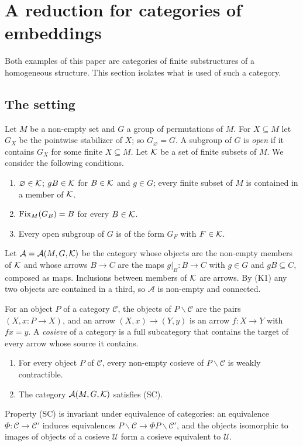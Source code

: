 \section{A reduction for categories of embeddings}\label{sec:reduction}

Both examples of this paper are categories of finite substructures of a
homogeneous structure. This section isolates what is used of such a category.

\subsection{The setting}

Let $M$ be a non-empty set and $G$ a group of permutations of $M$. For
$X\subseteq M$ let $G_X$ be the pointwise stabilizer of $X$; so
$G_\varnothing=G$. A subgroup of $G$ is \emph{open} if it contains $G_X$ for
some finite $X\subseteq M$. Let $\mathcal{K}$ be a set of finite subsets of $M$. We
consider the following conditions.
\begin{enumerate}
\item[\textup{(K1)}] $\varnothing\in\mathcal{K}$; $gB\in\mathcal{K}$ for $B\in\mathcal{K}$ and $g\in G$; every
 finite subset of $M$ is contained in a member of $\mathcal{K}$.
\item[\textup{(K2)}] $\operatorname{Fix}_M(G_B)=B$ for every $B\in\mathcal{K}$.
\item[\textup{(K3)}] Every open subgroup of $G$ is of the form $G_F$ with $F\in\mathcal{K}$.
\end{enumerate}
Let $\mathcal A=\mathcal A(M,G,\mathcal{K})$ be the category whose objects are the
non-empty members of $\mathcal{K}$ and whose arrows $B\to C$ are the maps
$g|_B\colon B\to C$ with $g\in G$ and $gB\subseteq C$, composed as maps.
Inclusions between members of $\mathcal{K}$ are arrows. By (K1) any two objects are
contained in a third, so $\mathcal A$ is non-empty and connected.

For an object $P$ of a category $\mathcal C$, the objects of
$P\backslash\mathcal C$ are the pairs $(X,x\colon P\to X)$, and an arrow
$(X,x)\to(Y,y)$ is an arrow $f\colon X\to Y$ with $fx=y$. A \emph{cosieve} of a
category is a full subcategory that contains the target of every arrow whose
source it contains.
\begin{enumerate}
\item[\textup{(SC)}] For every object $P$ of $\mathcal C$, every non-empty cosieve
 of $P\backslash\mathcal C$ is weakly contractible.
\item[\textup{(K4)}] The category $\mathcal A(M,G,\mathcal{K})$ satisfies \textup{(SC)}.
\end{enumerate}
Property (SC) is invariant under equivalence of categories: an equivalence
$\Phi\colon\mathcal C\to\mathcal C'$ induces equivalences
$P\backslash\mathcal C\to\Phi P\backslash\mathcal C'$, and the objects
isomorphic to images of objects of a cosieve $\mathcal U$ form a cosieve
equivalent to $\mathcal U$.

